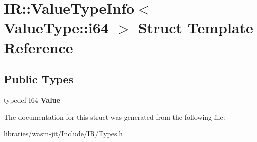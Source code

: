 \hypertarget{struct_i_r_1_1_value_type_info_3_01_value_type_1_1i64_01_4}{}\section{IR\+:\+:Value\+Type\+Info$<$ Value\+Type\+:\+:i64 $>$ Struct Template Reference}
\label{struct_i_r_1_1_value_type_info_3_01_value_type_1_1i64_01_4}
\subsection*{Public Types}
\begin{DoxyCompactItemize}
\item 
\mbox{\label{struct_i_r_1_1_value_type_info_3_01_value_type_1_1i64_01_4_af551e5f60680c361467df4f04d77a442}} 
typedef I64 {\bfseries Value}
\end{DoxyCompactItemize}


The documentation for this struct was generated from the following file\+:\begin{DoxyCompactItemize}
\item 
libraries/wasm-\/jit/\+Include/\+I\+R/Types.\+h\end{DoxyCompactItemize}
